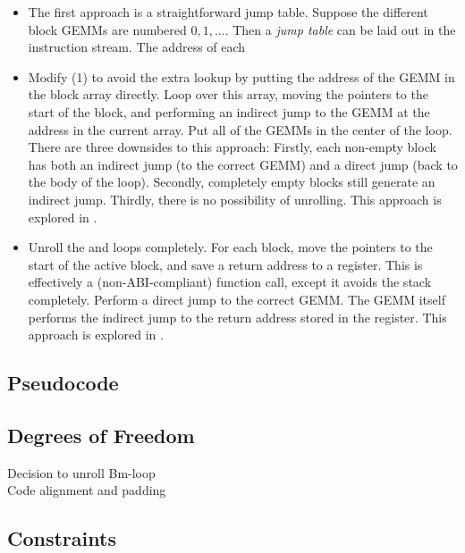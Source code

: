 {\begin{itemize}
  \item The first approach is a straightforward jump table. Suppose the different block GEMMs are numbered $0,1,...$. Then a \emph{jump table} can be laid out in the instruction stream. The address of each 


  \item Modify (1) to avoid the extra lookup by putting the address of the GEMM in the block array directly. Loop over this array, moving the  pointers to the start of the block, and performing an indirect jump to the GEMM at the address in the current array. Put all of the GEMMs in the center of the loop. There are three downsides to this approach: Firstly, each non-empty block has both an indirect jump (to the correct GEMM) and a direct jump (back to the body of the loop). Secondly, completely empty blocks still generate an indirect jump. Thirdly, there is no possibility of unrolling. This approach is explored in .

  \item Unroll the  and  loops completely. For each block, move the  pointers to the start of the active block, and save a return address to a register. This is effectively a (non-ABI-compliant) function call, except it avoids the stack completely. Perform a direct jump to the correct GEMM. The GEMM itself performs the indirect jump to the return address stored in the register. This approach is explored in .
\end{itemize}

\subsection{Pseudocode}


\subsection{Degrees of Freedom}
\begin{description}
  \item[Decision to unroll Bm-loop] 
  \item[Code alignment and padding]
\end{description}


\subsection{Constraints}

}
